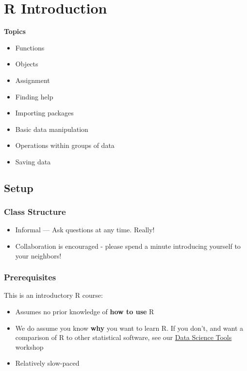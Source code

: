\documentclass[]{book}
\providecommand{\tightlist}{%
  \setlength{\itemsep}{0pt}\setlength{\parskip}{0pt}}
\begin{document}
\chapter{R Introduction}\label{r-introduction}

\textbf{Topics}

\begin{itemize}
\tightlist
\item
  Functions
\item
  Objects
\item
  Assignment
\item
  Finding help
\item
  Importing packages
\item
  Basic data manipulation
\item
  Operations within groups of data
\item
  Saving data
\end{itemize}

\section{Setup}\label{setup}

\subsection{Class Structure}\label{class-structure}

\begin{itemize}
\tightlist
\item
  Informal --- Ask questions at any time. Really!
\item
  Collaboration is encouraged - please spend a minute introducing
  yourself to your neighbors!
\end{itemize}

\subsection{Prerequisites}\label{prerequisites}

This is an introductory R course:

\begin{itemize}
\tightlist
\item
  Assumes no prior knowledge of \textbf{how to use} R
\item
  We do assume you know \textbf{why} you want to learn R. If you don't,
  and want a comparison of R to other statistical software, see our
  \href{./DataScienceTools.html}{Data Science Tools} workshop
\item
  Relatively slow-paced
\end{itemize}
\end{document}

